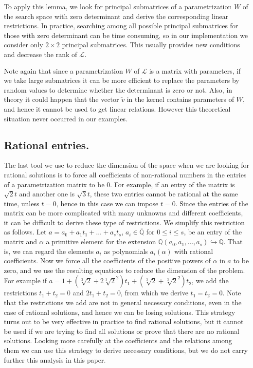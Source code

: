 \documentclass{amsart}
\theoremstyle{definition}
\theoremstyle{remark}
\numberwithin{equation}{section}
\newcommand{\eLL}{{\mathcal L}}
\newcommand{\Q}{{\mathbb Q}}
\begin{document}
 To apply this lemma, we look for principal submatrices of a parametrization $W$ of the search space with zero determinant and derive the corresponding linear restrictions. In practice, searching among all possible principal submatrices for those with zero determinant can be time consuming, so in our implementation we consider only $2 \times 2$ principal submatrices. This usually provides new conditions and decrease the rank of $\eLL$.

Note again that since a parametrization $W$ of $\eLL$ is a matrix with parameters, if we take large submatrices it can be more efficient to replace the parameters by random values to determine whether the determinant is zero or not. Also, in theory it could happen that the vector $\tilde v$ in the kernel contains parameters of $W$, and hence it cannot be used to get linear relations. However this theoretical situation never occurred in our examples.

\subsection{Rational entries.}
\label{subsection:rational}
The last tool we use to reduce the dimension of the space when we are looking for rational solutions is to force all coefficients of non-rational numbers in the entries of a parametrization matrix to be $0$. For example, if an entry of the matrix is $\sqrt{2} t$ and another one is $\sqrt{3} t$, these two entries cannot be rational at the same time, unless $t = 0$, hence in this case we can impose $t = 0$.  Since the entries of the matrix can be more complicated with many unknowns and different coefficients, it can be difficult to derive these type of restrictions. We simplify this restriction as follows. Let $a = a_0 + a_1 t_1 + \dots + a_s t_s$, $a_i \in \bar \Q$ for $0 \le i \le s$, be an entry of the matrix and $\alpha$ a primitive element for the extension $\Q(a_0, a_1, \dots, a_s) \hookrightarrow \Q$. That is, we can regard the elements $a_i$ as polynomials $a_i(\alpha)$ with rational coefficients. Now we force all the coefficients of the positive powers of $\alpha$ in $a$ to be zero, and we use the resulting equations to reduce the dimension of the problem. For example if $a = 1 + (\sqrt[3]{2} + 2 \sqrt[3]{2}^2) t_1 + (\sqrt[3]{2} + \sqrt[3]{2}^2) t_2$, we add the restrictions $t_1 + t_2 = 0$ and $2 t_1 + t_2 = 0$, from which we derive $t_1 = t_2 = 0$. Note that the restrictions we add are not in general necessary conditions, even in the case of rational solutions, and hence we can be losing solutions. This strategy turns out to be very effective in practice to find rational solutions, but it cannot be used if we are trying to find all solutions or prove that there are no rational solutions. Looking more carefully at the coefficients and the relations among them we can use this strategy to derive necessary conditions, but we do not carry further this analysis in this paper.
\end{document}
